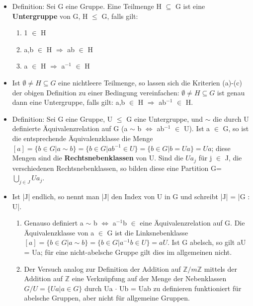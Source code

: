 \begin{itemize}
\item Definition: Sei G eine Gruppe. Eine Teilmenge H $\subseteq$ G ist eine \textbf{Untergruppe} von G, H $\le$ G, falls gilt:
\begin{enumerate}
\item 1 $\in$ H
\item a,b $\in$ H $\Rightarrow$ ab $\in$ H
\item a $\in$ H $\Rightarrow$ a$^{-1}$ $\in$ H
\end{enumerate}
\item
\begin{remark} Ist $\emptyset \neq H \subseteq G$ eine nichtleere Teilmenge, so lassen sich die Kriterien (a)-(c) der obigen Definition zu einer Bedingung vereinfachen: 
$\emptyset \neq H \subseteq G$ ist genau dann eine Untergruppe, falls gilt: a,b $\in$ H $\Rightarrow$ ab$^{-1}$ $\in$ H.
\end{remark}
\item Definition: Sei G eine Gruppe, U $\le$ G eine Untergruppe, und $\sim$ die durch U definierte Äquivalenzrelation auf G (a $\sim$ b $\Leftrightarrow$ ab$^{-1}$ $\in$ U). Ist a $\in$ G, so ist die entsprechende Äquivalenzklasse die Menge 
$[a]=\{ b \in G | a \sim b \} = \{ b \in G | ab^{-1} \in U \} = \{ b \in G | b = Ua \} = Ua$; 
diese Mengen sind die \textbf{Rechtsnebenklassen} von U. Sind die $Ua_j$ für j $\in$ J, die verschiedenen Rechtsnebenklassen, so bilden diese eine Partition G=$\bigcup\limits_{j \in J} Ua_j$.
\item Ist |J| endlich, so nennt man |J| den Index von U in G und schreibt |J| = |G : U|.
\begin{enumerate}
\item Genauso definiert a $\sim$ b $\Leftrightarrow$ a$^{-1}$b $\in$ eine Äquivalenzrelation auf G. Die Äquivalenzklasse von a $\in$ G ist die Linksnebenklasse $[a] = \{b \in G | a \sim b \} = \{ b \in G | a^{-1}b \in U \} = aU$. 
Ist G abelsch, so gilt aU = Ua; für eine nicht-abelsche Gruppe gilt dies im allgemeinen nicht.
\item Der Versuch analog zur Definition der Addition auf $\mathbb{Z}/m\mathbb{Z}$ mittels der Addition auf $\mathbb{Z}$ eine Verknüpfung auf der Menge der Nebenklassen $G/U = \{Ua | a \in G\}$ durch Ua $\cdot$ Ub = Uab zu definieren funktioniert für abelsche Gruppen, aber nicht für allgemeine Gruppen.
\end{enumerate}
\end{itemize}

